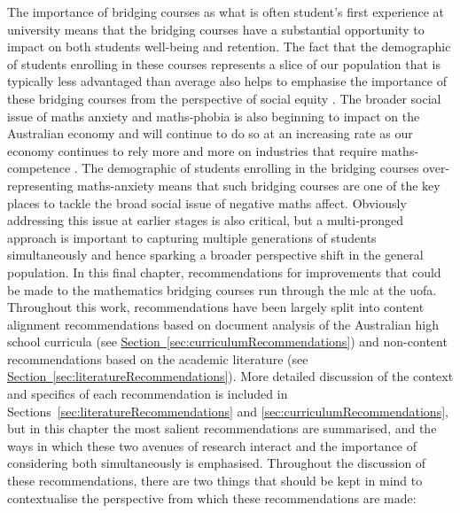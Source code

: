 \documentclass[twoside,12pt,a4paper]{report}
\newcommand{\refsec}[1]{\hyperref[sec:#1]{Section~\ref{sec:#1}}}
\begin{document}
The importance of bridging courses as what is often student's first experience at university means that the bridging courses have a substantial opportunity to impact on both students well-being and retention. The fact that the demographic of students enrolling in these courses represents a slice of our population that is typically less advantaged than average also helps to emphasise the importance of these bridging courses from the perspective of social equity \cite{Lee2008}. The broader social issue of maths anxiety and maths-phobia is also beginning to impact on the Australian economy and will continue to do so at an increasing rate as our economy continues to rely more and more on industries that require maths-competence \cite{King2015, Gordon2013}. The demographic of students enrolling in the bridging courses over-representing maths-anxiety means that such bridging courses are one of the key places to tackle the broad social issue of negative maths affect. Obviously addressing this issue at earlier stages is also critical, but a multi-pronged approach is important to capturing multiple generations of students simultaneously and hence sparking a broader perspective  shift in the general population. In this final chapter, recommendations for improvements that could be made to the mathematics bridging courses run through the \gls{mlc} at the \gls{uofa}. Throughout this work, recommendations have been largely split into content alignment recommendations based on document analysis of the Australian high school curricula (see \refsec{curriculumRecommendations}) and non-content recommendations based on the academic literature (see \refsec{literatureRecommendations}). More detailed discussion of the context and specifics of each recommendation is included in Sections~\ref{sec:literatureRecommendations} and \ref{sec:curriculumRecommendations}, but in this chapter the most salient recommendations are summarised, and the ways in which these two avenues of research interact and the importance of considering both simultaneously is emphasised. Throughout the discussion of these recommendations, there are two things that should be kept in mind to contextualise the perspective from which these recommendations are made:
\end{document}
